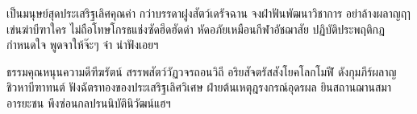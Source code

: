 \documentclass{article}
\begin{document}
เป็น{\wbr}มนุษย์{\wbr}สุด{\wbr}ประเสริฐ{\wbr}เลิศ{\wbr}คุณค่า กว่า{\wbr}บรรดา{\wbr}ฝูง{\wbr}สัตว์{\wbr}เดรัจฉาน{\wbr}
จง{\wbr}ฝ่าฟัน{\wbr}พัฒนา{\wbr}วิชาการ อย่า{\wbr}ล้างผลาญ{\wbr}ฤๅ{\wbr}เข่น{\wbr}ฆ่า{\wbr}บีฑา{\wbr}ใคร{\wbr}
ไม่{\wbr}ถือ{\wbr}โทษ{\wbr}โกรธ{\wbr}แช่ง{\wbr}ซัด{\wbr}ฮึดฮัด{\wbr}ด่า หัด{\wbr}อภัย{\wbr}เหมือน{\wbr}กีฬา{\wbr}อัชฌาสัย{\wbr}
ปฏิบัติ{\wbr}ประพฤติ{\wbr}กฎ{\wbr}กำหนด{\wbr}ใจ พูดจา{\wbr}ให้{\wbr}จ๊ะๆ จ๋า น่า{\wbr}ฟัง{\wbr}เอ{\wbr}ยฯ{\wbr}

ธรรมคุณ{\wbr}หนุน{\wbr}ความ{\wbr}ดี{\wbr}ฑีฆ{\wbr}รัตน์ สรรพ{\wbr}สัตว์{\wbr}วัฏ{\wbr}ว{\wbr}จร{\wbr}ถอน{\wbr}วิถี{\wbr}
อริยสัจ{\wbr}ตรัส{\wbr}สังโยค{\wbr}โลก{\wbr}โม{\wbr}ฬี ดัง{\wbr}กุม{\wbr}ภีร์{\wbr}ผลาญ{\wbr}ชิวหา{\wbr}บีฑา{\wbr}ทนต์{\wbr}
ฟัง{\wbr}ฉัตร{\wbr}ทอง{\wbr}ของ{\wbr}ประเสริฐ{\wbr}เลิศ{\wbr}วิเศษ ฝ่าย{\wbr}ต้นเหตุ{\wbr}ฎ{\wbr}รง{\wbr}กรณ์{\wbr}อุดร{\wbr}ผล{\wbr}
ยิน{\wbr}สถาน{\wbr}ฌาน{\wbr}สมา{\wbr}อารยะ{\wbr}ชน พึง{\wbr}ซ่อน{\wbr}กล{\wbr}ปรนนิบัติ{\wbr}นิ{\wbr}วัฒน์แฮฯ{\wbr}
\end{document}

